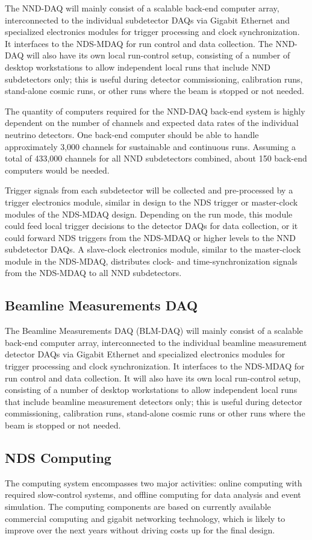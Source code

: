 The NND-DAQ will mainly consist of a scalable back-end computer array,
interconnected to the individual subdetector DAQs via Gigabit
Ethernet and specialized electronics modules for trigger processing
and clock synchronization. It interfaces to the NDS-MDAQ for run
control and data collection. The NND-DAQ will also have its own local
run-control setup, consisting of a number of desktop workstations to
allow independent local runs that include NND subdetectors only; this
is useful during detector commissioning, calibration runs, stand-alone
cosmic runs, or other runs where the beam is stopped or not needed.

The quantity of computers required for the NND-DAQ back-end system is
highly dependent on the number of channels and expected data rates of
the individual neutrino detectors.  One back-end computer should be
able to handle approximately 3,000 channels for sustainable and
continuous runs. Assuming a total of 433,000 channels for all NND
subdetectors combined, about 150 back-end computers would be needed.

Trigger signals from each subdetector will be collected and
pre-processed by a trigger electronics module, similar in design to
the NDS trigger or master-clock modules of the NDS-MDAQ
design. Depending on the run mode, this module could feed local
trigger decisions to the detector DAQs for data collection, or it
could forward NDS triggers from the NDS-MDAQ or higher levels to the
NND subdetector DAQs.  A slave-clock electronics module, similar to
the master-clock module in the NDS-MDAQ, distributes clock- and
time-synchronization signals from the NDS-MDAQ to all NND
subdetectors.

\subsection{Beamline Measurements DAQ}

The Beamline Measurements DAQ (BLM-DAQ) will mainly consist of a scalable back-end computer array,
interconnected to the individual beamline measurement detector DAQs
via Gigabit Ethernet and specialized electronics modules for trigger
processing and clock synchronization. It interfaces to the NDS-MDAQ
for run control and data collection. It will also have its own local
run-control setup, consisting of a number of desktop workstations to
allow independent local runs that include beamline measurement
detectors only; this is useful during detector commissioning,
calibration runs, stand-alone cosmic runs or other runs where the beam
is stopped or not needed.


\subsection{NDS Computing}
\label{sec:nd-gdaq-global-computing}

The computing system encompasses two major activities: online
computing with required slow-control systems, and offline computing
for data analysis and event simulation.  The computing components are
based on currently available commercial computing and gigabit
networking technology, which is likely to improve over the next years
without driving costs up for the final design.


